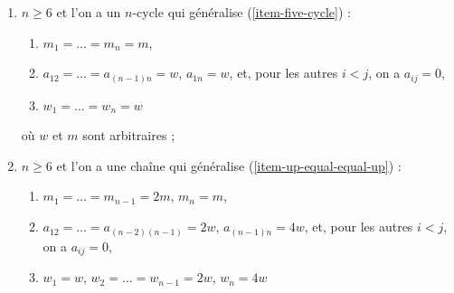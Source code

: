 \begin{lemma}[Genre un]
\begin{enumerate}
$n = 5$, et $m_i, a_{ij}, w_i, g_i$ sont donnés par
$$
\left(
\begin{matrix}
2m \\
2m \\
2m \\
m \\
m
\end{matrix}
\right),
\quad
\left(
\begin{matrix}
-2w & 2w & 0 & 0 & 0 \\
2w & -4w & 2w & 0 & 0 \\
0 & 2w & -4w & 2w & 2w \\
0 & 0 & 2w & -4w & 0 \\
0 & 0 & 2w & 0 & -4w \\
\end{matrix}
\right),
\quad
\left(
\begin{matrix}
w \\
2w \\
2w \\
2w \\
2w
\end{matrix}
\right),
\quad
\left(
\begin{matrix}
0 \\
0 \\
0 \\
0 \\
0
\end{matrix}
\right)
$$
où $w$ et $m$ sont arbitraires ;
\item
\label{item-n-cycle}
$n \geq 6$ et l'on a un $n$-cycle qui généralise (\ref{item-five-cycle}) :
\begin{enumerate}
\item $m_1 = \ldots = m_n = m$,
\item $a_{12} = \ldots = a_{(n - 1) n} = w$, $a_{1n} = w$,
et, pour les autres $i < j$, on a $a_{ij} = 0$,
\item $w_1 = \ldots = w_n = w$
\end{enumerate}
où $w$ et $m$ sont arbitraires ;
\item
\label{item-up-chain-equal-up}
$n \geq 6$ et l'on a une chaîne qui généralise (\ref{item-up-equal-equal-up}) :
\begin{enumerate}
\item $m_1 = \ldots = m_{n - 1} = 2m$, $m_n = m$,
\item $a_{12} = \ldots = a_{(n - 2) (n - 1)} = 2w$, $a_{(n - 1) n} = 4w$,
et, pour les autres $i < j$, on a $a_{ij} = 0$,
\item $w_1 = w$, $w_2 = \ldots = w_{n - 1} = 2w$, $w_n = 4w$

\end{enumerate}
\end{enumerate}
\end{lemma}
